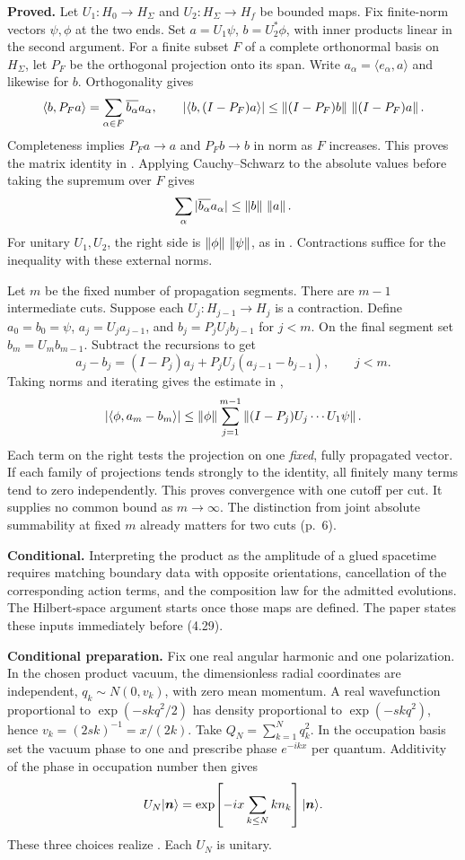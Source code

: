\newpage
{}
\textbf{Proved.} Let $U_1:H_0\to H_\Sigma$ and $U_2:H_\Sigma\to H_f$ be bounded maps. Fix finite-norm vectors $\psi,\phi$ at the two ends. Set $a=U_1\psi$, $b=U_2^*\phi$, with inner products linear in the second argument. For a finite subset $F$ of a complete orthonormal basis on $H_\Sigma$, let $P_F$ be the orthogonal projection onto its span. Write $a_\alpha=\langle e_\alpha,a\rangle$ and likewise for $b$. Orthogonality gives
\[
 \langle b,P_Fa\rangle=\sum_{\alpha\in F}\overline{b_\alpha}a_\alpha,\qquad
 |\langle b,(I-P_F)a\rangle|
 \le \left\lVert (I-P_F)b\right\rVert\,\left\lVert (I-P_F)a\right\rVert.
\]
Completeness implies $P_Fa\to a$ and $P_Fb\to b$ in norm as $F$ increases. This proves the matrix identity in . Applying Cauchy--Schwarz to the absolute values before taking the supremum over $F$ gives
\[
 \sum_\alpha |\overline{b_\alpha}a_\alpha|\le \left\lVert b\right\rVert\,\left\lVert a\right\rVert.
\]
For unitary $U_1,U_2$, the right side is $\left\lVert \phi\right\rVert\,\left\lVert \psi\right\rVert$, as in . Contractions suffice for the inequality with these external norms.

Let $m$ be the fixed number of propagation segments. There are $m-1$ intermediate cuts. Suppose each $U_j:H_{j-1}\to H_j$ is a contraction. Define $a_0=b_0=\psi$, $a_j=U_j a_{j-1}$, and $b_j=P_j U_j b_{j-1}$ for $j<m$. On the final segment set $b_m=U_mb_{m-1}$. Subtract the recursions to get
\[
 a_j-b_j=(I-P_j)a_j+P_jU_j(a_{j-1}-b_{j-1}),\qquad j<m.
\]
Taking norms and iterating gives the estimate in ,
\[
 |\langle\phi,a_m-b_m\rangle|
 \le \left\lVert \phi\right\rVert\sum_{j=1}^{m-1}\left\lVert (I-P_j)U_j\cdots U_1\psi\right\rVert.
\]
Each term on the right tests the projection on one \emph{fixed}, fully propagated vector. If each family of projections tends strongly to the identity, all finitely many terms tend to zero independently. This proves convergence with one cutoff per cut. It supplies no common bound as $m\to\infty$. The distinction from joint absolute summability at fixed $m$ already matters for two cuts (p.~6).

\textbf{Conditional.} Interpreting the product as the amplitude of a glued spacetime requires matching boundary data with opposite orientations, cancellation of the corresponding action terms, and the composition law for the admitted evolutions. The Hilbert-space argument starts once those maps are defined. The paper states these inputs immediately before (4.29).

\newpage
{}
\textbf{Conditional preparation.} Fix one real angular harmonic and one polarization. In the chosen product vacuum, the dimensionless radial coordinates are independent, $q_k\sim N(0,v_k)$, with zero mean momentum. A real wavefunction proportional to $\exp(-skq^2/2)$ has density proportional to $\exp(-skq^2)$, hence $v_k=(2sk)^{-1}=x/(2k)$. Take $Q_N=\sum_{k=1}^N q_k^2$. In the occupation basis set the vacuum phase to one and prescribe phase $e^{-ikx}$ per quantum. Additivity of the phase in occupation number then gives
\[
 U_N\lvert \boldsymbol n\rangle
 =\exp\!\left[-ix\sum_{k\le N}kn_k\right]\lvert \boldsymbol n\rangle.
\]
These three choices realize . Each $U_N$ is unitary.

